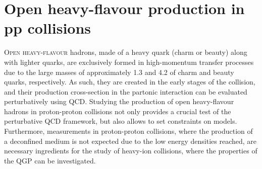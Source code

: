 \chapter{Open heavy-flavour production in pp collisions}

\lettrine[lines=6,findent=0.pt]{O}{pen heavy-flavour} hadrons, made of a heavy quark (charm or beauty) along with lighter quarks, are exclusively formed in high-momentum transfer processes due to the large masses of approximately 1.3 \gevcc and 4.2 \gevcc of charm and beauty quarks, respectively. As such, they are created in the early stages of the collision, and their production cross-section in the partonic interaction can be evaluated perturbatively using QCD. Studying the production of open heavy-flavour hadrons in proton-proton collisions not only provides a crucial test of the perturbative QCD framework, but also allows to set constraints on models. Furthermore, measurements in proton-proton collisions, where the production of a deconfined medium is not expected due to the low energy densities reached, are necessary ingredients for the study of heavy-ion collisions, where the properties of the QGP can be investigated. 

